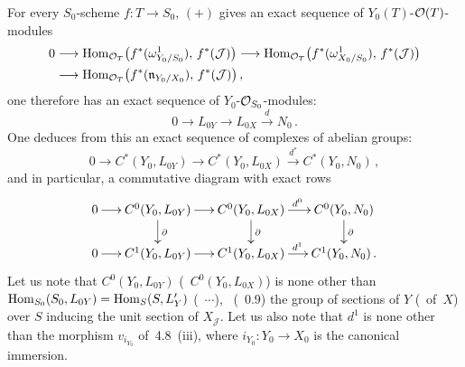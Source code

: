 \label{III.4.26}
{\renewcommand{\thefootnote}{(123)}}
For every \(S_{0}\)-scheme \(f\colon T\to S_{0}\), \((+)\) gives an exact
sequence of \(Y_{0}(T)\)-\(\mathcal{O}(T)\)-modules
\[
\begin{aligned}
0&\longrightarrow
\operatorname{Hom}_{\mathcal{O}_{T}}\bigl(f^{*}(\omega^{1}_{Y_{0}/S_{0}}),\,f^{*}(\mathcal{J})\bigr)
\longrightarrow
\operatorname{Hom}_{\mathcal{O}_{T}}\bigl(f^{*}(\omega^{1}_{X_{0}/S_{0}}),\,f^{*}(\mathcal{J})\bigr)
\\
&\longrightarrow
\operatorname{Hom}_{\mathcal{O}_{T}}\bigl(f^{*}(\mathfrak{n}_{Y_{0}/X_{0}}),\,f^{*}(\mathcal{J})\bigr)\,,
\end{aligned}
\]
one therefore has an exact sequence of \(Y_{0}\)-\(\mathcal{O}_{S_{0}}\)-modules:
\begin{equation}
0\longrightarrow L_{0Y}\longrightarrow L_{0X}\xrightarrow{d}N_{0}\,.
\tag{4.26.1}
\end{equation}
One deduces from this an exact sequence of complexes of abelian groups:
\[
0\longrightarrow
C^{*}(Y_{0},L_{0Y})\longrightarrow
C^{*}(Y_{0},L_{0X})\xrightarrow{d^{*}}
C^{*}(Y_{0},N_{0})\,,
\]
and in particular, a commutative diagram with exact rows
\[
\xymatrix@C=1.5em@R=1.8em{
0\ar[r]
&
C^{0}(Y_{0},L_{0Y})
  \ar[r]
  \ar[d]^{\partial}
&
C^{0}(Y_{0},L_{0X})
  \ar[r]^{d^{0}}
  \ar[d]^{\partial}
&
C^{0}(Y_{0},N_{0})
  \ar[d]^{\partial}
\\
0\ar[r]
&
C^{1}(Y_{0},L_{0Y})
  \ar[r]
&
C^{1}(Y_{0},L_{0X})
  \ar[r]^{d^{1}}
&
C^{1}(Y_{0},N_{0})\,.
}
\]
Let us note that \(C^{0}(Y_{0},L_{0Y})\) (\resp\ \(C^{0}(Y_{0},L_{0X})\)) is
none other than \(\operatorname{Hom}_{S_{0}}(S_{0},L_{0Y})=\operatorname{Hom}_{S}(S,L'_{Y})\)
(\resp\ \(\cdots\)), \ie\ (\cf~0.9) the group of sections of \(Y\) (\resp\
of~\(X\)) over \(S\) inducing the unit section of \(X_{\mathcal{J}}\). Let us
also note that \(d^{1}\) is none other than the morphism \(v_{i_{Y_{0}}}\)
of~4.8~(iii), where \(i_{Y_{0}}\colon Y_{0}\to X_{0}\) is the canonical
immersion.%
{\renewcommand{\thefootnote}{(124)}}

